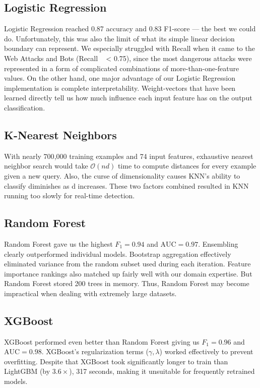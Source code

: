 \subsection{Logistic Regression}
Logistic Regression reached 0.87 accuracy and 0.83 F1-score — the best we could do. Unfortunately, this was also the limit of what its simple linear decision boundary can represent. We especially struggled with Recall when it came to the Web Attacks and Bots (Recall ~ < 0.75), since the most dangerous attacks were represented in a form of complicated combinations of more-than-one-feature values. On the other hand, one major advantage of our Logistic Regression implementation is complete interpretability. Weight-vectors that have been learned directly tell us how much influence each input feature has on the output classification.

\subsection{K-Nearest Neighbors}

With nearly 700{,}000 training examples and 74 input features, exhaustive nearest neighbor search would take $\mathcal{O}(nd)$ time to compute distances for every example given a new query. Also, the curse of dimensionality causes KNN's ability to classify diminishes as d increases. These two factors combined resulted in KNN running too slowly for real-time detection.

\subsection{Random Forest}

Random Forest gave us the highest $F_1 = 0.94$ and $\mathrm{AUC} = 0.97$. Ensembling clearly outperformed individual models. Bootstrap aggregation effectively eliminated variance from the random subset used during each iteration. Feature importance rankings also matched up fairly well with our domain expertise. But Random Forest stored 200 trees in memory. Thus, Random Forest may become impractical when dealing with extremely large datasets.

\subsection{XGBoost}

XGBoost performed even better than Random Forest giving us $F_1 = 0.96$ and $\mathrm{AUC} = 0.98$. XGBoost’s regularization terms ($\gamma, \lambda$) worked effectively to prevent overfitting. Despite that XGBoost took significantly longer to train than LightGBM (by $3.6\times$), 317 seconds, making it unsuitable for frequently retrained models.

